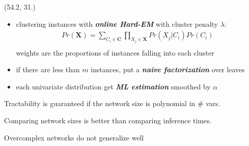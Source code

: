 \documentclass[final]{beamer}
\begin{document}
\begin{frame}{}
\begin{textblock}{80}
    
  \end{textblock}
  
  
  \begin{textblock}{25.7}(54.2, 31.)
    \small
    \begin{itemize}
  \item clustering instances with \textbf{\emph{online Hard-EM}} with cluster penalty
    $\lambda$:
    \[\begin{array}{cc}
        Pr(\mathbf{X})= \sum_{C_i \in \mathbf{C}}\prod_{X_j \in \mathbf{X}}Pr(X_j|C_i)Pr(C_i)\\
      \end{array}\]
      weights are the proportions of instances falling into each cluster
    \item if there are less than $m$ instances, put a \textbf{\emph{naive
          factorization}} over leaves
    \item each univariate distribution get \emph{\textbf{ML
          estimation}} smoothed by $\alpha$  
    \end{itemize}

    Tractability is guaranteed if the network size is polynomial in \#
    vars.\par\bigskip

    Comparing network sizes is better than comparing inference times.\par\bigskip

    Overcomplex networks do not generalize well\par\bigskip
    

\end{textblock}
\end{frame}
\end{document}
